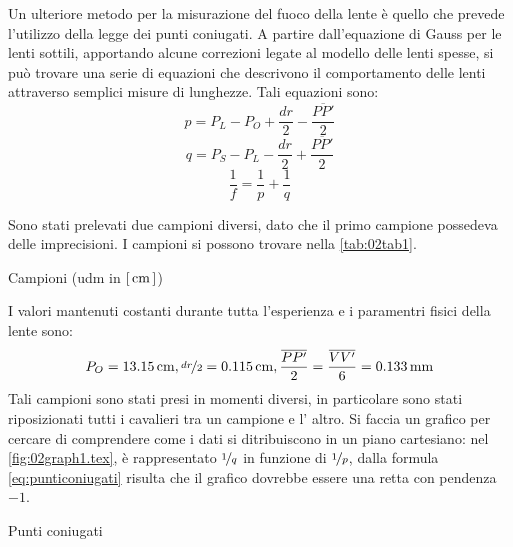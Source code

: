 Un ulteriore metodo per la misurazione del fuoco della lente è quello che prevede l'utilizzo della legge dei punti coniugati.
 A partire dall'equazione di Gauss per le lenti sottili, apportando alcune correzioni legate al modello delle lenti
 spesse, si può trovare una serie di equazioni che descrivono il comportamento delle lenti attraverso semplici misure di
 lunghezze. Tali equazioni sono:
\[p=P_L - P_O + \frac {dr} {2} - \frac {\overline{PP'}}{2}\]
\[q=P_S - P_L -\frac {dr} {2} + \frac {\overline{PP'}} {2}\]
\begin{equation} \label{eq:punticoniugati}
\frac{1}{f} = \frac {1}{p} + \frac {1}{q}
\end{equation}

 Sono stati prelevati due campioni diversi, dato che il primo campione possedeva delle imprecisioni. I campioni si possono trovare
 nella \autoref{tab:02tab1}.
\begin{tabella}
	\centering
	
	\caption{Campioni (udm in $[\,\mathrm{cm}\,]$)}
	\label{tab:02tab1}
\end{tabella}
%
I valori mantenuti costanti durante tutta l'esperienza e i paramentri fisici della lente sono:
\[P_O = 13.15 \,\mathrm{cm} , \nicefrac{dr}{2} = 0.115 \,\mathrm{cm} ,\frac {\overline{PP'}}{2} = \frac{\overline{VV'}}{6} = 0.133 \,\mathrm{mm}\]
Tali campioni sono stati presi in momenti diversi, in particolare sono stati riposizionati tutti i cavalieri tra un campione e l'
 altro. Si faccia un grafico per cercare di comprendere come i dati si ditribuiscono in un piano cartesiano: nel  \autoref{fig:02graph1.tex}, è rappresentato $\nicefrac{1}{q}$ in funzione di $\nicefrac{1}{p}$, dalla formula
 \eqref{eq:punticoniugati} risulta che il grafico dovrebbe essere una retta con
 pendenza $-1$.
\begin{grafico} \centering  \caption{Punti coniugati} \label{fig:02graph1.tex} \end{grafico}

